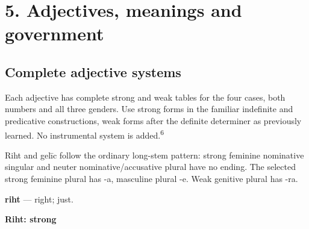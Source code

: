 \par\endgroup

\par\begin{minipage}{\linewidth}\raggedright
\section*{5. Adjectives, meanings and government}

\subsection*{Complete adjective systems}

Each adjective has complete strong and weak tables for the four cases, both numbers and all three genders. Use strong forms in the familiar indefinite and predicative constructions, weak forms after the definite determiner as previously learned. No instrumental system is added.\textsuperscript{6}
\end{minipage}\par\addvspace{4pt}


Riht and gelīc follow the ordinary long-stem pattern: strong feminine nominative singular and neuter nominative/\allowbreak{}accusative plural have no ending. The selected strong feminine plural has -a, masculine plural -e. Weak genitive plural has -ra.

\textbf{riht} — right; just.

\textbf{Riht: strong}

